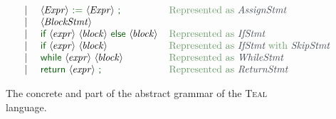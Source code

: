 \begin{figure}
\[\begin{array}[t]{lcl@{\hspace{0.4cm}}l}
               & \VB   & \nt{Expr}\ \vterminal{:=}\ \nt{Expr}\ \vterminal{;} & \astmap{Represented as } \ntaX{AssignStmt}\\
               & \VB   & \nt{BlockStmt} \\
               & \VB   & \vterminal{if}\ \nt{expr}\ \nt{block}\ \vterminal{else}\ \nt{block} & \astmap{Represented as } \ntaX{IfStmt}\\
               & \VB   & \vterminal{if}\ \nt{expr}\ \nt{block}\ & \astmap{Represented as \ntaX{IfStmt} with \ntaX{SkipStmt}} \\
               & \VB   & \vterminal{while}\ \nt{expr}\ \nt{block} & \astmap{Represented as } \ntaX{WhileStmt}\\
               & \VB   & \vterminal{return}\ \nt{expr}\ \vterminal{;} & \astmap{Represented as } \ntaX{ReturnStmt}\\
  \end{array}
\]
\caption{\label{fig:tealGrammar} The concrete and part of the abstract grammar of the \textsc{Teal} language.}
\end{figure}


